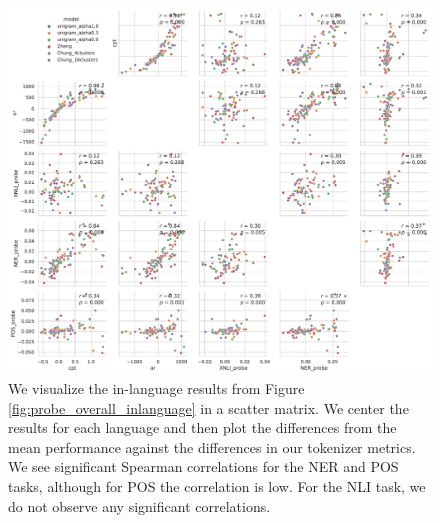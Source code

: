 \begin{figure}[H]
    \centering
    \includegraphics[width=\textwidth]{figures/probe_detailed_inlanguage_scattermatrix.pdf}
    \caption{We visualize the in-language results from Figure \ref{fig:probe_overall_inlanguage} in a scatter matrix. We center the results for each language and then plot the differences from the mean performance against the differences in our tokenizer metrics. We see significant Spearman correlations for the NER and POS tasks, although for POS the correlation is low. For the NLI task, we do not observe any significant correlations.}
    \label{fig:probe_overall_inlanguage_scattermatrix}
\end{figure}

